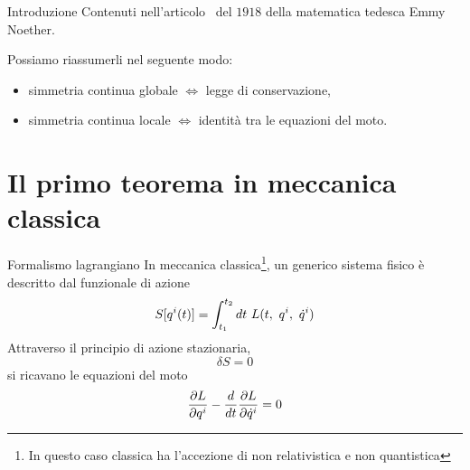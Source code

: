 

\begin{frame}
    \titlepage
\end{frame}


\begin{frame}{Introduzione}
    Contenuti nell'articolo~ del $1918$ della matematica tedesca Emmy Noether. 

    \hfill 

    Possiamo riassumerli nel seguente modo:
\begin{itemize}
    \item simmetria continua globale $\iff$ legge di conservazione,
    \item simmetria continua locale $\iff$ identità tra le equazioni del moto.
\end{itemize}

\end{frame}

\section{Il primo teorema in meccanica classica}

\begin{frame}{Formalismo lagrangiano}
    In meccanica classica\footnote{In questo caso classica ha l'accezione di non relativistica e non quantistica}, un generico sistema fisico è descritto dal funzionale di azione
    \begin{equation*}
         S[q^i(t)] = \int_{t_1}^{t_2}dt~ L(t, ~q^i, ~\dot q^i)
    \end{equation*} 
    Attraverso il principio di azione stazionaria,
    \begin{equation*}
        \delta S = 0
    \end{equation*}
    si ricavano le equazioni del moto 
    \begin{equation*}
        \frac{\partial L}{\partial q^i} - \frac{d}{dt} \frac{\partial L}{\partial\dot q^i} = 0
    \end{equation*} 
\end{frame}


